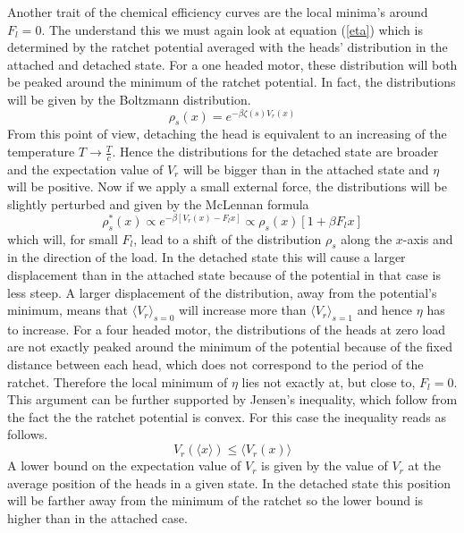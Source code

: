 \documentclass[aps,pre,twocolumn,showpacs,showkeys,a4paper]{revtex4}
\begin{document}
Another trait of the chemical efficiency curves are the local minima's around $F_l=0$. 
The understand this we must again look at equation (\ref{eta}) which is determined by the ratchet potential averaged with the heads' distribution in the attached and detached state. 
For a one headed motor, these distribution will both be peaked around the minimum of the ratchet potential. 
In fact, the distributions will be given by the Boltzmann distribution.
\begin{equation}
\rho_s (x) = e^{-\beta \zeta(s) V_r(x)}
\end{equation} 
From this point of view, detaching the head is equivalent to an increasing of the temperature $T\rightarrow\frac{T}{c}$. 
Hence the distributions for the detached state are broader and the expectation value of $V_r$ will be bigger than in the attached state and $\eta$ will be positive. 
Now if we apply a small external force, the distributions will be slightly perturbed and given by the McLennan formula
\begin{equation}
\rho_s^*(x) \propto e^{-\beta \left[V_r(x) - F_l x\right]}\propto \rho_s(x)\left[1 + \beta F_l x\right]
\end{equation}
which will, for small $F_l$, lead to a shift of the distribution $\rho_s$ along the $x$-axis and in the direction of the load. 
In the detached state this will cause a larger displacement than in the attached state because of the potential in that case is less steep. 
A larger displacement of the distribution, away from the potential's minimum, means that $\langle V_r \rangle_{s=0}$ will increase more than $\langle V_r \rangle_{s=1}$ and hence $\eta$ has to increase. 
For a four headed motor, the distributions of the heads at zero load are not exactly peaked around the minimum of the potential because of the fixed distance between each head,  which does not correspond to the period of the ratchet. 
Therefore the local minimum of $\eta$ lies not exactly at, but close to, $F_l =0$.
This argument can be further supported by Jensen's inequality, which follow from the fact the the ratchet potential is convex. For this case the inequality reads as follows.
\begin{equation}
V_r(\langle x \rangle) \leq \langle V_r(x) \rangle
\end{equation} 
A lower bound on the expectation value of $V_r$ is given by the value of $V_r$ at the average position of the heads in a given state. 
In the detached state this position will be farther away from the minimum of the ratchet so the lower bound is higher than in the attached case.
\end{document}
